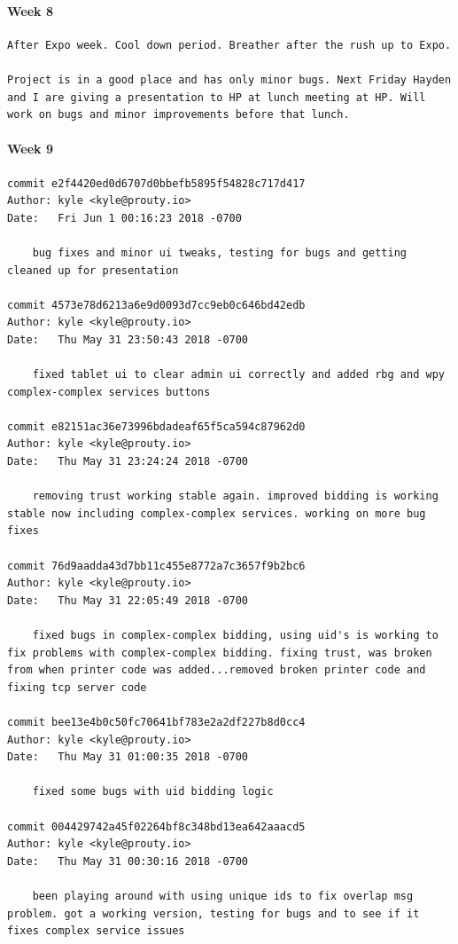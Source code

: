 \documentclass[draftclsnofoot, onecolumn, compsoc, 10pt]{IEEEtran}
\begin{document}
\paragraph{Week 8}
\begin{lstlisting}
After Expo week. Cool down period. Breather after the rush up to Expo. 

Project is in a good place and has only minor bugs. Next Friday Hayden and I are giving a presentation to HP at lunch meeting at HP. Will work on bugs and minor improvements before that lunch. 
\end{lstlisting}
\paragraph{Week 9}
\begin{lstlisting}
commit e2f4420ed0d6707d0bbefb5895f54828c717d417 
Author: kyle <kyle@prouty.io> 
Date:   Fri Jun 1 00:16:23 2018 -0700 

    bug fixes and minor ui tweaks, testing for bugs and getting cleaned up for presentation 

commit 4573e78d6213a6e9d0093d7cc9eb0c646bd42edb 
Author: kyle <kyle@prouty.io> 
Date:   Thu May 31 23:50:43 2018 -0700 

    fixed tablet ui to clear admin ui correctly and added rbg and wpy complex-complex services buttons 

commit e82151ac36e73996bdadeaf65f5ca594c87962d0 
Author: kyle <kyle@prouty.io> 
Date:   Thu May 31 23:24:24 2018 -0700 

    removing trust working stable again. improved bidding is working stable now including complex-complex services. working on more bug fixes 

commit 76d9aadda43d7bb11c455e8772a7c3657f9b2bc6 
Author: kyle <kyle@prouty.io> 
Date:   Thu May 31 22:05:49 2018 -0700 

    fixed bugs in complex-complex bidding, using uid's is working to fix problems with complex-complex bidding. fixing trust, was broken from when printer code was added...removed broken printer code and fixing tcp server code 

commit bee13e4b0c50fc70641bf783e2a2df227b8d0cc4 
Author: kyle <kyle@prouty.io> 
Date:   Thu May 31 01:00:35 2018 -0700 

    fixed some bugs with uid bidding logic 

commit 004429742a45f02264bf8c348bd13ea642aaacd5 
Author: kyle <kyle@prouty.io> 
Date:   Thu May 31 00:30:16 2018 -0700 

    been playing around with using unique ids to fix overlap msg problem. got a working version, testing for bugs and to see if it fixes complex service issues 
\end{lstlisting}
\end{document}
